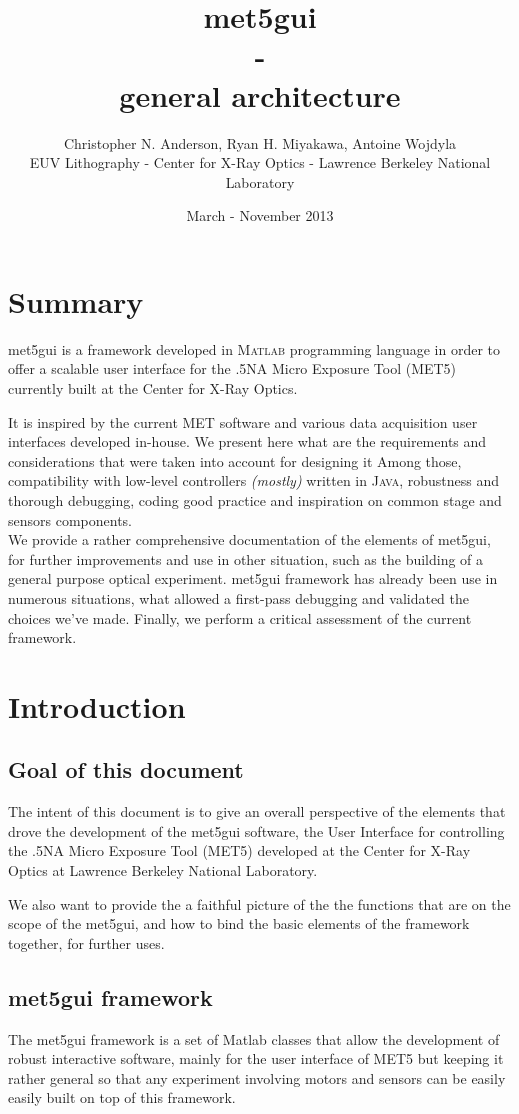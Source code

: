 \documentclass[10pt,letter,twoside]{report}
\author{Christopher N. Anderson, Ryan H. Miyakawa, Antoine Wojdyla\\
EUV Lithography - Center for X-Ray Optics - Lawrence Berkeley National Laboratory}
\date{March - November 2013}
\title{met5gui\\ -\\ general architecture}
\newcommand{\comment}[1] {{\it (#1)}}
\begin{document}
\maketitle
\cleardoublepage
\chapter*{Summary}
met5gui is a framework developed in \textsc{Matlab} programming language in order to offer a scalable user interface for the .5NA Micro Exposure Tool (MET5) currently built at the Center for X-Ray Optics.

It is inspired by the current MET software and various data acquisition user interfaces developed in-house. 
We present here what are the requirements and considerations that were taken into account for designing it
Among those, compatibility with low-level controllers \comment{mostly} written in \textsc{Java}, robustness and thorough debugging, coding good practice and inspiration on common stage and sensors components.\\

We provide a rather comprehensive documentation of the elements of met5gui, for further improvements and use in other situation, such as the building of a general purpose optical experiment. met5gui framework has already been use in numerous situations, what allowed a first-pass debugging and validated the choices we've made.
Finally, we perform a critical assessment of the current framework.


\tableofcontents
\chapter{Introduction}
\section{Goal of this document}
The intent of this document is to give an overall perspective of the elements that drove the development of the met5gui software, the User Interface for controlling the .5NA Micro Exposure Tool (MET5) developed at the Center for X-Ray Optics at Lawrence Berkeley National Laboratory.

We also want to provide the a faithful picture of the the functions that are on the scope of the met5gui, and how to bind the basic elements of the framework together, for further uses.
\section{met5gui framework}
The met5gui framework is a set of Matlab classes that allow the development of robust interactive software, mainly for the user interface of MET5 but keeping it rather general so that any experiment involving motors and sensors can be easily easily built on top of this framework.
\end{document}
